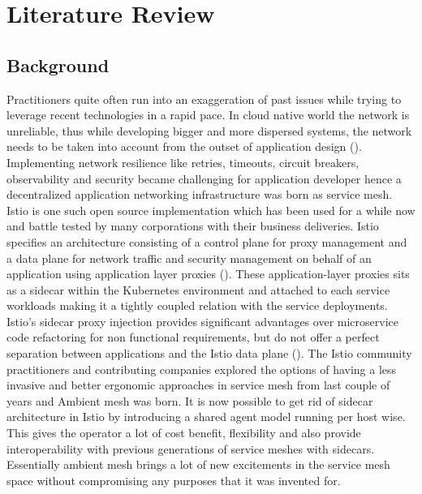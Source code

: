 \section{Literature Review}

\subsection{Background}
Practitioners quite often run into an exaggeration of past issues while trying to leverage recent technologies in a rapid pace. In cloud native world the network is unreliable, thus while developing bigger and more dispersed systems, the network needs to be taken into account from the outset of application design (\cite{posta2022Design}). Implementing network resilience like retries, timeouts, circuit breakers, observability and security became challenging for application developer hence a decentralized application networking infrastructure was born as service mesh. Istio is one such open source implementation which has been used for a while now and battle tested by many corporations with their business deliveries. Istio specifies an architecture consisting of a control plane for proxy management and a data plane for network traffic and security management on behalf of an application using application layer proxies (\cite{posta2022Layers}). These application-layer proxies sits as a sidecar within the Kubernetes environment and attached to each service workloads making it a tightly coupled relation with the service deployments. Istio's sidecar proxy injection provides significant advantages over microservice code refactoring for non functional requirements, but do not offer a perfect separation between applications and the Istio data plane (\cite{istioHoward2022}). The Istio community practitioners and contributing companies explored the options of having a less invasive and better ergonomic approaches in service mesh  from last couple of years and Ambient mesh was born. It is now possible to get rid of sidecar architecture in Istio by introducing a shared agent model running per host wise. This gives the operator a lot of cost benefit, flexibility and also provide interoperability with previous generations of service meshes with sidecars. Essentially ambient mesh brings a lot of new excitements in the service mesh space without compromising any purposes that it was invented for.

